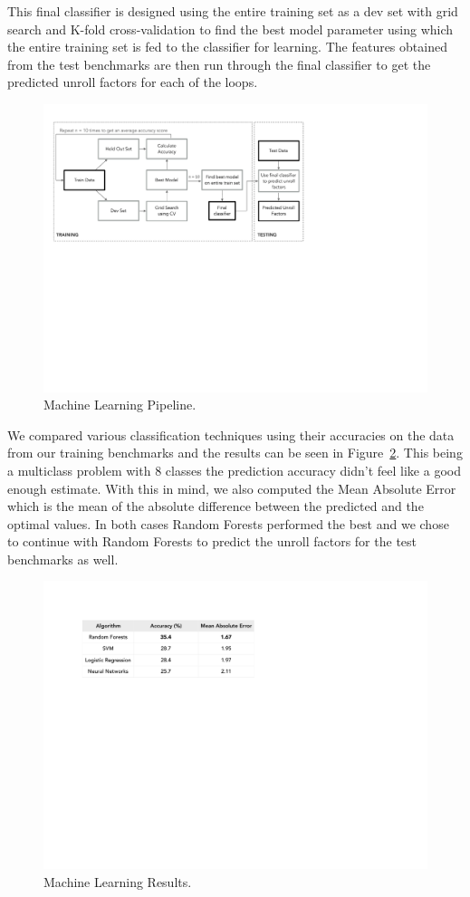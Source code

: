 \documentclass[]{sig-alternate}
\begin{document}
This final classifier is designed using the entire training set as a dev set with grid search and K-fold cross-validation to find the best model parameter using which the entire training set is fed to the classifier for learning. The features obtained from the test benchmarks are then run through the final classifier to get the predicted unroll factors for each of the loops. 

\begin{figure}
  \center
  \includegraphics[width=0.9\linewidth]{fig/mlPipeline.pdf}
  \caption{Machine Learning Pipeline.}
  \label{fig:mlPipeline}
\end{figure}

We compared various classification techniques using their accuracies on the data from our training benchmarks and the results can be seen in Figure~\ref{fig:mlResults}. This being a multiclass problem with 8 classes the prediction accuracy didn't feel like a good enough estimate. With this in mind, we also computed the Mean Absolute Error which is the mean of the absolute difference between the predicted and the optimal values. In both cases Random Forests performed the best and we chose to continue with Random Forests to predict the unroll factors for the test benchmarks as well. 

\begin{figure}
  \center
  \includegraphics[width=0.9\linewidth]{fig/mlResults.pdf}
  \caption{Machine Learning Results.}
  \label{fig:mlResults}
\end{figure}
\end{document}
